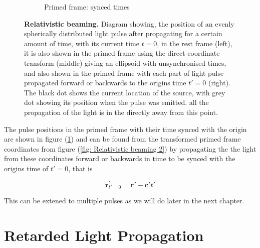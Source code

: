 \begin{figure}[H]
\begin{subfigure}{.32\textwidth}
		\caption{Primed frame: synced times}
		\label{fig: Relativistic beaming 3}
	\end{subfigure}
	\caption{\textbf{Relativistic beaming.} Diagram showing, the position of an evenly spherically distributed light pulse after propagating for a certain amount of time, with its current time ${t}=0$, in the rest frame (left), it is also shown in the primed frame using the direct coordinate transform (middle) giving an ellipsoid with unsynchronised times, and also shown in the primed frame with each part of light pulse propagated forward or backwards to the origins time $t{'}=0$ (right). The black dot shows the current location of the source, with grey dot showing its position when the pulse was emitted. all the propagation of the light is in the directly away from this point.}
	\label{fig Relativistic beaming}
\end{figure}

The pulse positions in the primed frame with their time synced with the origin are shown in figure (\ref{fig: Relativistic beaming 3}) and can be found from the transformed primed frame coordinates from figure (\ref{fig: Relativistic beaming 2}) by propagating the the light from these coordinates forward or backwards in time to be synced with the origins time of $t{'}=0$, that is

\begin{equation}
	\mathbf{r}^{'}_{t{'}=0} = \mathbf{r}{'} - \mathbf{c}{'} t{'}
\end{equation}

This can be extened to multiple pulses as we will do later in the next chapter.



\section{Retarded Light Propagation}\label{subsect: Retarded Light Propagation}

